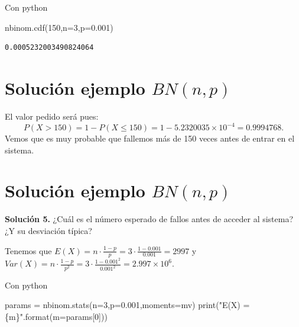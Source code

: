 \documentclass[
  letterpaper,
  DIV=11,
  numbers=noendperiod]{scrreprt}
\newenvironment{Shaded}{\begin{snugshade}}{\end{snugshade}}
\newcommand{\BuiltInTok}[1]{\textcolor[rgb]{0.00,0.23,0.31}{#1}}
\newcommand{\DecValTok}[1]{\textcolor[rgb]{0.68,0.00,0.00}{#1}}
\newcommand{\FloatTok}[1]{\textcolor[rgb]{0.68,0.00,0.00}{#1}}
\newcommand{\NormalTok}[1]{\textcolor[rgb]{0.00,0.23,0.31}{#1}}
\newcommand{\OperatorTok}[1]{\textcolor[rgb]{0.37,0.37,0.37}{#1}}
\newcommand{\SpecialCharTok}[1]{\textcolor[rgb]{0.37,0.37,0.37}{#1}}
\newcommand{\StringTok}[1]{\textcolor[rgb]{0.13,0.47,0.30}{#1}}
\begin{document}
Con python

\begin{Shaded}
\begin{Highlighting}[]
\NormalTok{nbinom.cdf(}\DecValTok{150}\NormalTok{,n}\OperatorTok{=}\DecValTok{3}\NormalTok{,p}\OperatorTok{=}\FloatTok{0.001}\NormalTok{)}
\end{Highlighting}
\end{Shaded}

\begin{verbatim}
0.0005232003490824064
\end{verbatim}

\section{\texorpdfstring{Solución ejemplo
\(BN(n,p)\)}{Solución ejemplo BN(n,p)}}\label{soluciuxf3n-ejemplo-bnnp-2}

El valor pedido será pues: \[
P(X>150)=1-P(X\leq 150)=1-\ensuremath{5.2320035\times 10^{-4}}=0.9994768.
\] Vemos que es muy probable que fallemos más de 150 veces antes de
entrar en el sistema.

\section{\texorpdfstring{Solución ejemplo
\(BN(n,p)\)}{Solución ejemplo BN(n,p)}}\label{soluciuxf3n-ejemplo-bnnp-3}

\textbf{Solución 5.} ¿Cuál es el número esperado de fallos antes de
acceder al sistema? ¿Y su desviación típica?

Tenemos que
\(E(X)=n\cdot \frac{1-p}{p}=3\cdot \frac{1- 0.001}{0.001}=2997\) y
\(Var(X)=n\cdot \frac{1-p}{p^2}=3\cdot \frac{1- 0.001^2}{0.001^2}=\ensuremath{2.997\times 10^{6}}.\)

Con python

\begin{Shaded}
\begin{Highlighting}[]
\NormalTok{params }\OperatorTok{=}\NormalTok{ nbinom.stats(n}\OperatorTok{=}\DecValTok{3}\NormalTok{,p}\OperatorTok{=}\FloatTok{0.001}\NormalTok{,moments}\OperatorTok{=}\StringTok{\textquotesingle{}mv\textquotesingle{}}\NormalTok{)}
\BuiltInTok{print}\NormalTok{(}\StringTok{"E(X) = }\SpecialCharTok{\{m\}}\StringTok{"}\NormalTok{.}\BuiltInTok{format}\NormalTok{(m}\OperatorTok{=}\NormalTok{params[}\DecValTok{0}\NormalTok{]))}
\end{Highlighting}
\end{Shaded}
\end{document}
